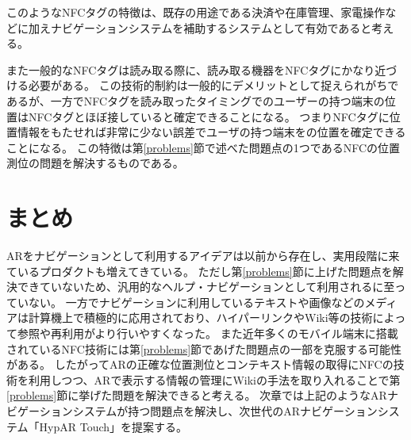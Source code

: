 このようなNFCタグの特徴は、既存の用途である決済や在庫管理、家電操作などに加えナビゲーションシステムを補助するシステムとして有効であると考える。

また一般的なNFCタグは読み取る際に、読み取る機器をNFCタグにかなり近づける必要がある。
この技術的制約は一般的にデメリットとして捉えられがちであるが、一方でNFCタグを読み取ったタイミングでのユーザーの持つ端末の位置はNFCタグとほぼ接していると確定できることになる。
つまりNFCタグに位置情報をもたせれば非常に少ない誤差でユーザの持つ端末をの位置を確定できることになる。
この特徴は第\ref{problems}節で述べた問題点の1つであるNFCの位置測位の問題を解決するものである。


\section{まとめ}
ARをナビゲーションとして利用するアイデアは以前から存在し、実用段階に来ているプロダクトも増えてきている。
ただし第\ref{problems}節に上げた問題点を解決できていないため、汎用的なヘルプ・ナビゲーションとして利用されるに至っていない。
一方でナビゲーションに利用しているテキストや画像などのメディアは計算機上で積極的に応用されており、ハイパーリンクやWiki等の技術によって参照や再利用がより行いやすくなった。
また近年多くのモバイル端末に搭載されているNFC技術には第\ref{problems}節であげた問題点の一部を克服する可能性がある。
したがってARの正確な位置測位とコンテキスト情報の取得にNFCの技術を利用しつつ、ARで表示する情報の管理にWikiの手法を取り入れることで第\ref{problems}節に挙げた問題を解決できると考える。
次章では上記のようなARナビゲーションシステムが持つ問題点を解決し、次世代のARナビゲーションシステム「HypAR Touch」を提案する。